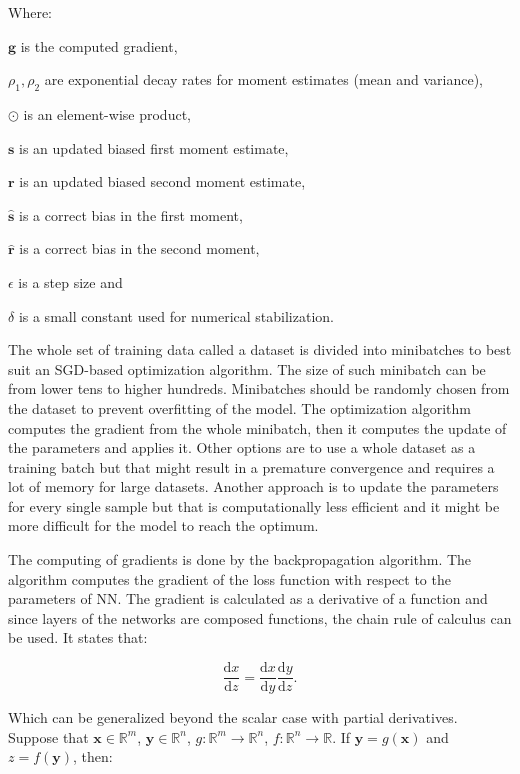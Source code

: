 \noindent Where:

$\pmb g$ is the computed gradient,

$\rho_1, \rho_2$ are exponential decay rates for moment estimates (mean and variance),

$\odot$ is an element-wise product,

$\pmb s$ is an updated biased first moment estimate,

$\pmb r$ is an updated biased second moment estimate,

$\hat{\pmb s}$ is a correct bias in the first moment,

$\hat{\pmb r}$ is a correct bias in the second moment,

$\epsilon$ is a step size and

$\delta$ is a small constant used for numerical stabilization.
\vspace{0.2cm}

The whole set of training data called a dataset is divided into minibatches to best suit an SGD-based optimization algorithm. The size of such minibatch can be from lower tens to higher hundreds. Minibatches should be randomly chosen from the dataset to prevent overfitting of the model. The optimization algorithm computes the gradient from the whole minibatch, then it computes the update of the parameters and applies it. Other options are to use a whole dataset as a training batch but that might result in a premature convergence and requires a lot of memory for large datasets. Another approach is to update the parameters for every single sample but that is computationally less efficient and it might be more difficult for the model to reach the optimum.

The computing of gradients is done by the backpropagation algorithm. The algorithm computes the gradient of the loss function with respect to the parameters of NN. The gradient is calculated as a derivative of a function and since layers of the networks are composed functions, the chain rule of calculus can be used. It states that:

$$\frac{\mathrm{d}x}{\mathrm{d}z} = \frac{\mathrm{d}x}{\mathrm{d}y}\frac{\mathrm{d}y}{\mathrm{d}z} .$$

\noindent Which can be generalized beyond the scalar case with partial derivatives. Suppose that $\pmb x \in \mathbb{R}^m$, $\pmb y \in \mathbb{R}^n$, $g: \mathbb{R}^m \rightarrow \mathbb{R}^n$, $f: \mathbb{R}^n \rightarrow \mathbb{R}$. If $\pmb y = g(\pmb x )$ and $z = f(\pmb y )$, then:

